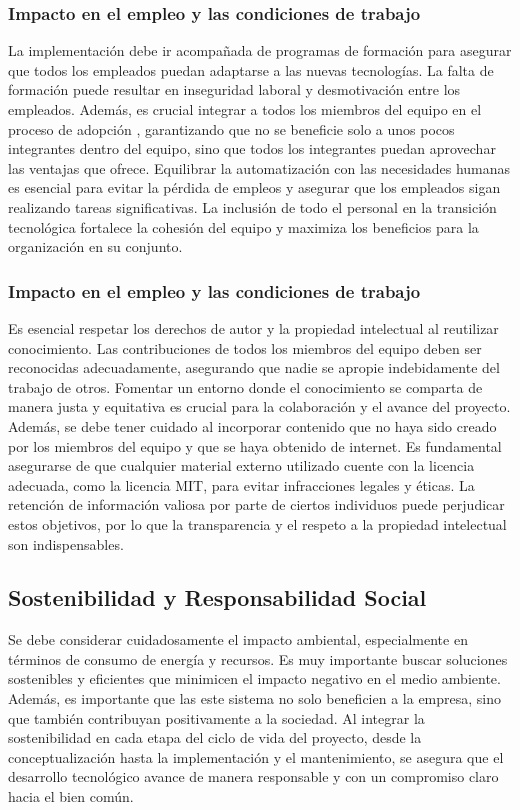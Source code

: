 \subsubsection{Impacto en el empleo y las condiciones de trabajo}
La implementación debe ir acompañada de programas de formación para asegurar 
que todos los empleados puedan adaptarse a las nuevas tecnologías. La falta de formación 
puede resultar en inseguridad laboral y desmotivación entre los empleados. Además, es 
crucial integrar a todos los miembros del equipo en el proceso de adopción , 
garantizando que no se beneficie solo a unos pocos integrantes dentro del equipo, sino que 
todos los integrantes puedan aprovechar las ventajas que ofrece. Equilibrar 
la automatización con las necesidades humanas es esencial para evitar la pérdida de 
empleos y asegurar que los empleados sigan realizando tareas significativas. La inclusión 
de todo el personal en la transición tecnológica fortalece la cohesión del equipo y 
maximiza los beneficios para la organización en su conjunto.

\subsubsection{Impacto en el empleo y las condiciones de trabajo}
Es esencial respetar los derechos de autor y la propiedad intelectual 
al reutilizar conocimiento. Las contribuciones de todos los miembros 
del equipo deben ser reconocidas adecuadamente, asegurando que nadie se 
apropie indebidamente del trabajo de otros. Fomentar un entorno donde el 
conocimiento se comparta de manera justa y equitativa es crucial para la colaboración 
y el avance del proyecto. Además, se debe tener cuidado al incorporar contenido que 
no haya sido creado por los miembros del equipo y que se haya obtenido de internet. 
Es fundamental asegurarse de que cualquier material externo utilizado cuente con la 
licencia adecuada, como la licencia MIT, para evitar infracciones legales y éticas. La 
retención de información valiosa por parte de ciertos individuos puede perjudicar 
estos objetivos, por lo que la transparencia y el respeto a la propiedad intelectual son indispensables.

\subsection{Sostenibilidad y Responsabilidad Social} %
Se debe considerar cuidadosamente el impacto ambiental, especialmente en términos de 
consumo de energía y recursos. Es muy importante buscar soluciones sostenibles y 
eficientes que minimicen el impacto negativo en el medio ambiente. Además, es importante que 
las este sistema no solo beneficien a la empresa, sino que también contribuyan positivamente 
a la sociedad. Al integrar la sostenibilidad en cada etapa del ciclo de vida del proyecto, 
desde la conceptualización hasta la implementación y el mantenimiento, se asegura que el 
desarrollo tecnológico avance de manera responsable y con un compromiso claro hacia el bien común.


